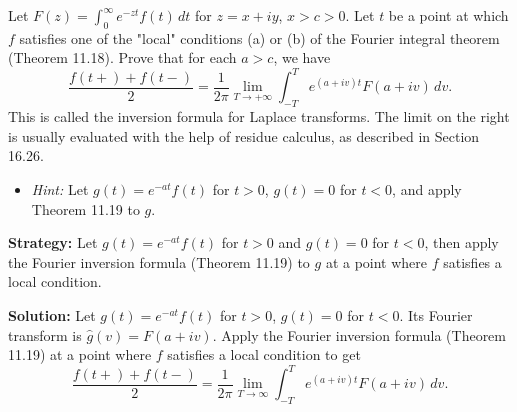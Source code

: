 \begin{problembox}
Let $F(z) = \int_0^\infty e^{-zt} f(t) \, dt$ for $z = x + iy$, $x > c > 0$. Let $t$ be a point at which $f$ satisfies one of the "local" conditions (a) or (b) of the Fourier integral theorem (Theorem 11.18). Prove that for each $a > c$, we have
\[
\frac{f(t+) + f(t-)}{2} = \frac{1}{2\pi} \lim_{T \to +\infty} \int_{-T}^T e^{(a + iv)t} F(a + iv) \, dv.
\]
This is called the inversion formula for Laplace transforms. The limit on the right is usually evaluated with the help of residue calculus, as described in Section 16.26.
\begin{itemize}
\item \textit{Hint:} Let $g(t) = e^{-at} f(t)$ for $t > 0$, $g(t) = 0$ for $t < 0$, and apply Theorem 11.19 to $g$.
\end{itemize}
\end{problembox}

\noindent\textbf{Strategy:} Let $g(t)=e^{-at}f(t)$ for $t>0$ and $g(t)=0$ for $t<0$, then apply the Fourier inversion formula (Theorem 11.19) to $g$ at a point where $f$ satisfies a local condition.

\bigskip\noindent\textbf{Solution:}
Let $g(t)=e^{-at}f(t)$ for $t>0$, $g(t)=0$ for $t<0$. Its Fourier transform is $\widehat g(v)=F(a+iv)$. Apply the Fourier inversion formula (Theorem 11.19) at a point where $f$ satisfies a local condition to get
\[\frac{f(t+)+f(t-)}{2}=\frac{1}{2\pi}\lim_{T\to\infty}\int_{-T}^T e^{(a+iv)t}F(a+iv)\,dv.\]

